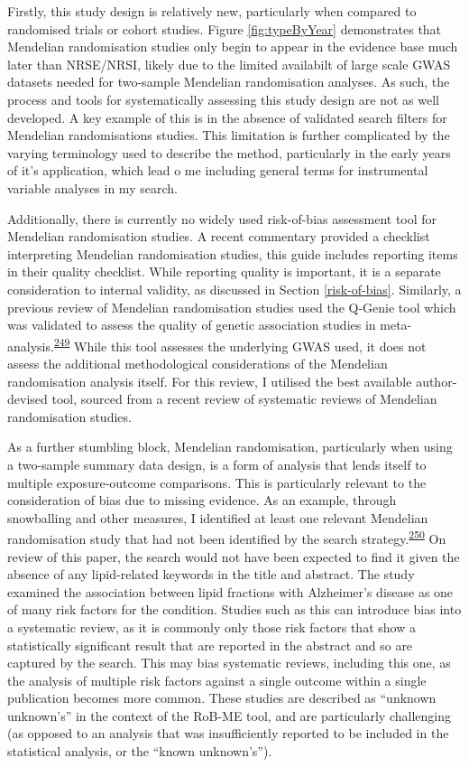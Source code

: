 \documentclass[a4paper, twoside]{templates/ociamthesis}
\begin{document}
Firstly, this study design is relatively new, particularly when compared to randomised trials or cohort studies. Figure \ref{fig:typeByYear} demonstrates that Mendelian randomisation studies only begin to appear in the evidence base much later than NRSE/NRSI, likely due to the limited availabilt of large scale GWAS datasets needed for two-sample Mendelian randomisation analyses. As such, the process and tools for systematically assessing this study design are not as well developed. A key example of this is in the absence of validated search filters for Mendelian randomisations studies. This limitation is further complicated by the varying terminology used to describe the method, particularly in the early years of it's application, which lead o me including general terms for instrumental variable analyses in my search.

Additionally, there is currently no widely used risk-of-bias assessment tool for Mendelian randomisation studies. A recent commentary provided a checklist interpreting Mendelian randomisation studies, this guide includes reporting items in their quality checklist. While reporting quality is important, it is a separate consideration to internal validity, as discussed in Section \ref{risk-of-bias}. Similarly, a previous review of Mendelian randomisation studies used the Q-Genie tool which was validated to assess the quality of genetic association studies in meta-analysis.\textsuperscript{\protect\hyperlink{ref-sohani2015}{249}} While this tool assesses the underlying GWAS used, it does not assess the additional methodological considerations of the Mendelian randomisation analysis itself. For this review, I utilised the best available author-devised tool, sourced from a recent review of systematic reviews of Mendelian randomisation studies.

As a further stumbling block, Mendelian randomisation, particularly when using a two-sample summary data design, is a form of analysis that lends itself to multiple exposure-outcome comparisons. This is particularly relevant to the consideration of bias due to missing evidence. As an example, through snowballing and other measures, I identified at least one relevant Mendelian randomisation study that had not been identified by the search strategy.\textsuperscript{\protect\hyperlink{ref-larsson2017b}{250}} On review of this paper, the search would not have been expected to find it given the absence of any lipid-related keywords in the title and abstract. The study examined the association between lipid fractions with Alzheimer's disease as one of many risk factors for the condition. Studies such as this can introduce bias into a systematic review, as it is commonly only those risk factors that show a statistically significant result that are reported in the abstract and so are captured by the search. This may bias systematic reviews, including this one, as the analysis of multiple risk factors against a single outcome within a single publication becomes more common. These studies are described as ``unknown unknown's'' in the context of the RoB-ME tool, and are particularly challenging (as opposed to an analysis that was insufficiently reported to be included in the statistical analysis, or the ``known unknown's'').
\end{document}
